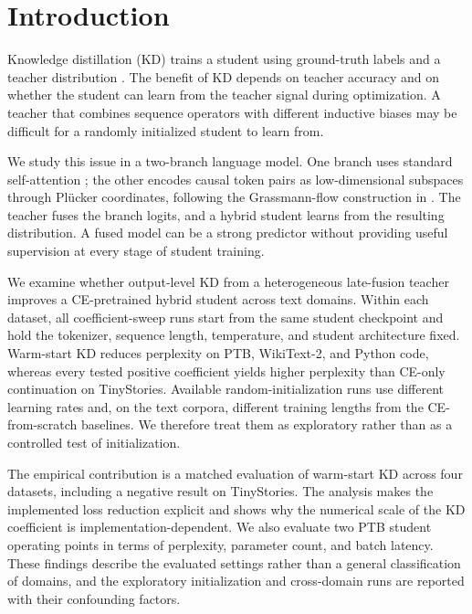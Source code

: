 \documentclass[conference]{IEEEtran}
\begin{document}
\section{Introduction}

Knowledge distillation (KD) trains a student using ground-truth labels and a
teacher distribution \cite{hinton2015distilling,gou2021knowledge}.  The benefit
of KD depends on teacher accuracy and on whether the student can learn from
the teacher signal during optimization.  A teacher that combines sequence
operators with different inductive biases may be difficult for a randomly
initialized student to learn from.

We study this issue in a two-branch language model.  One branch uses standard
self-attention \cite{vaswani2017attention}; the other encodes causal token
pairs as low-dimensional subspaces through Pl\"ucker coordinates, following
the Grassmann-flow construction in \cite{zhang2025attentionnot}.  The teacher
fuses the branch logits, and a hybrid student learns from the resulting
distribution.  A fused model can be a strong predictor without providing
useful supervision at every stage of student training.

We examine whether output-level KD from a heterogeneous late-fusion teacher
improves a CE-pretrained hybrid student across text domains.  Within each
dataset, all coefficient-sweep runs start from the same student checkpoint and
hold the tokenizer, sequence length, temperature, and student architecture
fixed.  Warm-start KD reduces perplexity on PTB, WikiText-2, and Python code,
whereas every tested positive coefficient yields higher perplexity than
CE-only continuation on TinyStories.  Available random-initialization runs use
different learning rates and, on the text corpora, different training lengths
from the CE-from-scratch baselines.  We therefore treat them as exploratory
rather than as a controlled test of initialization.

The empirical contribution is a matched evaluation of warm-start KD across
four datasets, including a negative result on TinyStories.  The analysis makes
the implemented loss reduction explicit and shows why the numerical scale of
the KD coefficient is implementation-dependent.  We also evaluate two PTB
student operating points in terms of perplexity, parameter count, and batch
latency.  These findings describe the evaluated settings rather than a general
classification of domains, and the exploratory initialization and
cross-domain runs are reported with their confounding factors.
\end{document}
